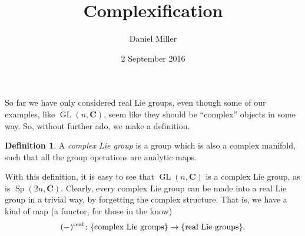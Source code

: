\documentclass{article}
\title{Complexification}
\author{Daniel Miller}
\date{2 September 2016}
\DeclareMathOperator{\GL}{GL}
\DeclareMathOperator{\Sp}{Sp}
\newcommand{\bC}{{\mathbf C}}
\newcommand{\real}{\mathrm{real}}
\theoremstyle{definition}
\newtheorem{definition}{Definition}
\begin{document}
\maketitle





So far we have only considered real Lie groups, even though some of our 
examples, like $\GL(n,\bC)$, seem like they should be ``complex'' objects in 
some way. So, without further ado, we make a definition. 

\begin{definition}
A \emph{complex Lie group} is a group which is also a complex manifold, such 
that all the group operations are analytic maps.  
\end{definition}

With this definition, it is easy to see that $\GL(n,\bC)$ is a complex Lie 
group, as is $\Sp(2n,\bC)$. Clearly, every complex Lie group can be made into 
a real Lie group in a trivial way, by forgetting the complex structure. That 
is, we have a kind of map (a functor, for those in the know)
\[
	(-)^\real \colon \{\textnormal{complex Lie groups}\} \to \{\textnormal{real Lie groups}\} .
\]
\end{document}
